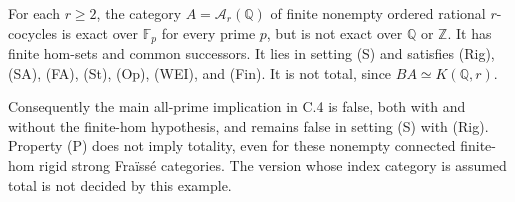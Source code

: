 \begin{theorem}
\label{C4:counterexample}
For each $r\geq2$, the category $A=\mathcal A_r(\mathbb Q)$ of finite
nonempty ordered rational $r$-cocycles is exact over $\mathbb F_p$
for every prime $p$, but is not exact over $\mathbb Q$ or $\mathbb Z$.
It has finite hom-sets and common successors. It lies in setting (S)
and satisfies (Rig), (SA), (FA), (St), (Op), (WEI), and (Fin).
It is not total, since $BA\simeq K(\mathbb Q,r)$.

Consequently the main all-prime implication in C.4 is false, both
with and without the finite-hom hypothesis, and remains false in
setting (S) with (Rig). Property (P) does not imply totality, even
for these nonempty connected finite-hom rigid strong Fra\"iss\'e
categories. The version whose index category is assumed total is
not decided by this example.
\end{theorem}

